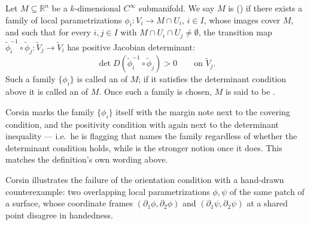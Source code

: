 \begin{definition}
\label{def:orientable_manifold}
Let $M \subseteq \mathbb{R}^n$ be a $k$-dimensional $C^\infty$ submanifold. We say $M$ is
 () if there exists a family of local
parametrizations $\phi_i : V_i \to M \cap U_i$, $i \in I$, whose images cover $M$, and such
that for every $i,j \in I$ with $M \cap U_i \cap U_j \neq \emptyset$, the transition map
$\widetilde\phi_i^{-1}\circ\widetilde\phi_j : \widetilde V_j \to \widetilde V_i$ has positive
Jacobian determinant:
\[\det D(\widetilde\phi_i^{-1}\circ\widetilde\phi_j) > 0 \qquad \text{on } \widetilde V_j.\]
Such a family $\{\phi_i\}$ is called an  of $M$; if it satisfies the
determinant condition above it is called an  of $M$. Once such a family
is chosen, $M$ is said to be .
\end{definition}

\begin{ainote}
Corsin marks the family $\{\phi_i\}$ itself with the margin note  next
to the covering condition, and the positivity condition with  again next to the
determinant inequality --- i.e.\ he is flagging that  names the family regardless of
whether the determinant condition holds, while  is the stronger notion once it
does. This matches the definition's own wording above.
\end{ainote}

Corsin illustrates the failure of the orientation condition with a hand-drawn counterexample:
two overlapping local parametrizations $\phi, \psi$ of the same patch of a surface, whose
coordinate frames $(\partial_1\phi,\partial_2\phi)$ and $(\partial_1\psi,\partial_2\psi)$ at a
shared point disagree in handedness.

